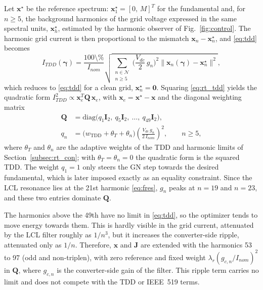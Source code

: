\documentclass[conference]{IEEEtran}
\newcommand{\gv}{\boldsymbol{\gamma}}
\newcommand{\pct}{\text{\char`\%}}
\begin{document}
Let $\mathbf{x}^\star$ be the reference spectrum:
$\mathbf{x}_1^\star = [0,\,M]^T$ for the fundamental and, for $n\geq 5$,
the background harmonics of the grid voltage expressed in the same spectral
units, $\mathbf{x}^\star_h$, estimated by the harmonic observer of
Fig.~\ref{fig:control}. The harmonic grid current is then proportional to the mismatch
$\mathbf{x}_n - \mathbf{x}_n^\star$, and \eqref{eq:tdd} becomes
%
\begin{equation}
  I_{TDD}(\gv) = \frac{100\pct}{I_{nom}}
  \sqrt{\sum_{\substack{n\in\mathcal{N}\\ n\geq5}}
  \Big(\frac{V_{dc}}{2}\,g_n\Big)^{\!2}
  \big\|\mathbf{x}_n(\gv)-\mathbf{x}_n^\star\big\|^2},
  \label{eq:rt_tdd}
\end{equation}
%
which reduces to \eqref{eq:tdd} for a clean grid,
$\mathbf{x}_n^\star = \mathbf{0}$. Squaring \eqref{eq:rt_tdd} yields the
quadratic form $I_{TDD}^2 \propto \mathbf{x}_e^T\mathbf{Q}\,\mathbf{x}_e$,
with $\mathbf{x}_e = \mathbf{x}^\star - \mathbf{x}$ and the diagonal
weighting matrix
%
\begin{align}
  \mathbf{Q} &= \mathrm{diag}\big(q_1\mathbf{I}_2,\ q_5\mathbf{I}_2,
                \ \dots,\ q_{49}\mathbf{I}_2\big), \nonumber\\
  q_n &= \big(w_{\mathrm{TDD}}+\theta_T+\theta_n\big)
         \left(\frac{V_{dc}\,g_n}{2\,I_{nom}}\right)^{\!2},
  \qquad n\geq 5,
  \label{eq:rt_Q}
\end{align}
%
where $\theta_T$ and $\theta_n$ are the adaptive weights of the TDD and
harmonic limits of Section~\ref{subsec:rt_con}; with
$\theta_T=\theta_n=0$ the quadratic form is the squared TDD.
The weight $q_1 = 1$ only steers the GN step towards the desired
fundamental, which is later imposed exactly as an equality constraint.
Since the LCL resonance lies at the 21st harmonic \eqref{eq:fres}, $g_n$
peaks at $n = 19$ and $n = 23$, and these two entries dominate
$\mathbf{Q}$.

The harmonics above the 49th have no limit in \eqref{eq:tdd}, so the
optimizer tends to move energy towards them. This is hardly visible in the
grid current, attenuated by the LCL filter roughly as $1/n^3$, but it
increases the converter-side ripple, attenuated only as $1/n$. Therefore,
$\mathbf{x}$ and $\mathbf{J}$ are extended with the harmonics 53 to 97 (odd
and non-triplen), with zero reference and fixed weight
$\lambda_r(g_{c,n}/I_{nom})^2$ in $\mathbf{Q}$, where $g_{c,n}$ is the
converter-side gain of the filter. This ripple term carries no limit and
does not compete with the TDD or IEEE~519 terms.
\end{document}

